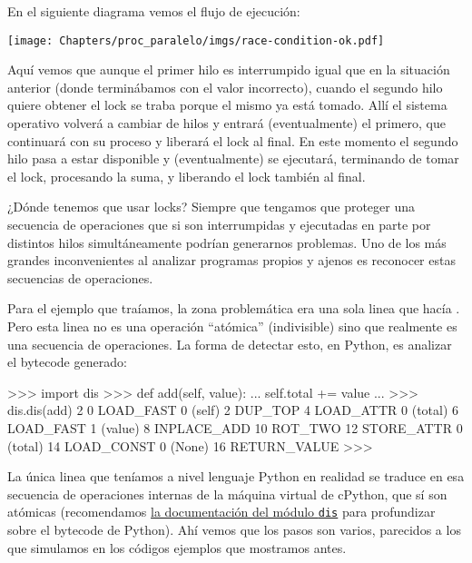 En el siguiente diagrama vemos el flujo de ejecución:

\begin{center}
    \texttt{[image: Chapters/proc\_paralelo/imgs/race-condition-ok.pdf]}
\end{center}
    
Aquí vemos que aunque el primer hilo es interrumpido igual que en la situación anterior (donde terminábamos con el valor incorrecto), cuando el segundo hilo quiere obtener el lock se traba porque el mismo ya está tomado. Allí el sistema operativo volverá a cambiar de hilos y entrará (eventualmente) el primero, que continuará con su proceso y liberará el lock al final. En este momento el segundo hilo pasa a estar disponible y (eventualmente) se ejecutará, terminando de tomar el lock, procesando la suma, y liberando el lock también al final.

¿Dónde tenemos que usar locks? Siempre que tengamos que proteger una secuencia de operaciones que si son interrumpidas y ejecutadas en parte por distintos hilos simultáneamente podrían generarnos problemas. Uno de los más grandes inconvenientes al analizar programas propios y ajenos es reconocer estas secuencias de operaciones.

Para el ejemplo que traíamos, la zona problemática era una sola linea que hacía . Pero esta linea no es una operación ``atómica'' (indivisible) sino que realmente es una secuencia de operaciones. La forma de detectar esto, en Python, es analizar el bytecode generado:

\begin{py}
>>> import dis
>>> def add(self, value):
...   self.total += value
... 
>>> dis.dis(add)
  2           0 LOAD_FAST                0 (self)
              2 DUP_TOP
              4 LOAD_ATTR                0 (total)
              6 LOAD_FAST                1 (value)
              8 INPLACE_ADD
             10 ROT_TWO
             12 STORE_ATTR               0 (total)
             14 LOAD_CONST               0 (None)
             16 RETURN_VALUE
>>> 
\end{py}

La única linea que teníamos a nivel lenguaje Python en realidad se traduce en esa secuencia de operaciones internas de la máquina virtual de cPython, que sí son atómicas (recomendamos \href{https://docs.python.org/dev/library/dis.html}{la documentación del módulo \texttt{dis}} para profundizar sobre el bytecode de Python). Ahí vemos que los pasos son varios, parecidos a los que simulamos en los códigos ejemplos que mostramos antes. 


